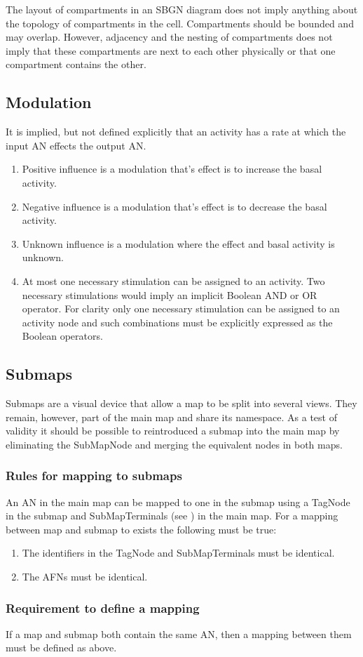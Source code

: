 The layout of compartments in an SBGN diagram does not imply anything about the topology of compartments in the cell. Compartments should be bounded and may overlap. However, adjacency and the nesting of compartments does not imply that these compartments are next to each other physically or that one compartment contains the other.

\subsection{Modulation}

It is implied, but not defined explicitly that an activity has a rate at which the input AN effects the output AN. 

\begin{enumerate}
\item Positive influence is a modulation that's effect is to increase the basal activity.
\item Negative influence is a modulation that's effect is to decrease the basal activity.
\item Unknown influence is a modulation where the effect and basal activity is unknown.
\item At most one necessary stimulation can be assigned to an activity. Two necessary stimulations
  would imply an implicit Boolean AND or OR operator. For clarity only
  one necessary stimulation can be assigned to an activity node and such combinations must be
  explicitly expressed as the Boolean operators.
\end{enumerate}

\subsection{Submaps}

Submaps are a visual device that allow a map to be split into several views. They remain, however, part of the main map and share its
namespace. As a test of validity it should be possible to reintroduced a submap into the main map by eliminating the SubMapNode and merging
the equivalent nodes in both maps.

\subsubsection{Rules for mapping to submaps}

An AN in the main map can be mapped to one in the submap using a TagNode in the submap and SubMapTerminals (see ) in the main map. For a
mapping between map and submap to exists the following must be true:

\begin{enumerate}
\item The identifiers in the TagNode and SubMapTerminals must be identical.
\item The AFNs must be identical.
\end{enumerate}

\subsubsection{Requirement to define a mapping}

If a map and submap both contain the same AN, then a mapping between them must be defined as above.